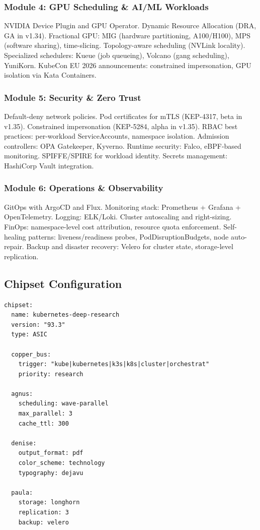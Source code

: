 \documentclass[11pt,letterpaper]{article}
\begin{document}
\subsubsection{Module 4: GPU Scheduling \& AI/ML Workloads}
NVIDIA Device Plugin and GPU Operator. Dynamic Resource Allocation (DRA, GA in v1.34). Fractional GPU: MIG (hardware partitioning, A100/H100), MPS (software sharing), time-slicing. Topology-aware scheduling (NVLink locality). Specialized schedulers: Kueue (job queueing), Volcano (gang scheduling), YuniKorn. KubeCon EU 2026 announcements: constrained impersonation, GPU isolation via Kata Containers.

\subsubsection{Module 5: Security \& Zero Trust}
Default-deny network policies. Pod certificates for mTLS (KEP-4317, beta in v1.35). Constrained impersonation (KEP-5284, alpha in v1.35). RBAC best practices: per-workload ServiceAccounts, namespace isolation. Admission controllers: OPA Gatekeeper, Kyverno. Runtime security: Falco, eBPF-based monitoring. SPIFFE/SPIRE for workload identity. Secrets management: HashiCorp Vault integration.

\subsubsection{Module 6: Operations \& Observability}
GitOps with ArgoCD and Flux. Monitoring stack: Prometheus + Grafana + OpenTelemetry. Logging: ELK/Loki. Cluster autoscaling and right-sizing. FinOps: namespace-level cost attribution, resource quota enforcement. Self-healing patterns: liveness/readiness probes, PodDisruptionBudgets, node auto-repair. Backup and disaster recovery: Velero for cluster state, storage-level replication.

\subsection{Chipset Configuration}

\begin{asciibox}
\begin{verbatim}
chipset:
  name: kubernetes-deep-research
  version: "93.3"
  type: ASIC

  copper_bus:
    trigger: "kube|kubernetes|k3s|k8s|cluster|orchestrat"
    priority: research

  agnus:
    scheduling: wave-parallel
    max_parallel: 3
    cache_ttl: 300

  denise:
    output_format: pdf
    color_scheme: technology
    typography: dejavu

  paula:
    storage: longhorn
    replication: 3
    backup: velero
\end{verbatim}
\end{asciibox}
\end{document}
